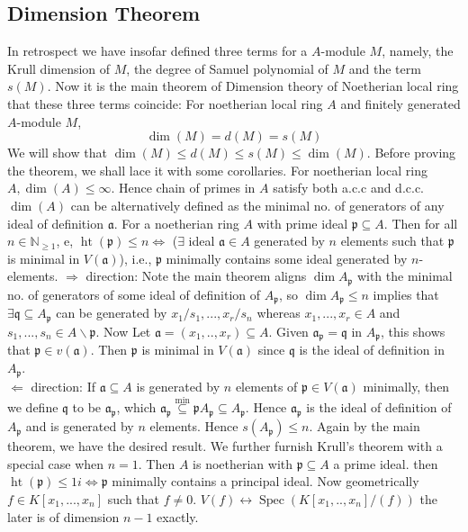 \documentclass[12pt]{article}
\theoremstyle{definition}
\theoremstyle{plain}
\DeclareMathOperator{\Spec}{Spec}
\DeclareMathOperator{\Ht}{ht}
\newcommand{\nat}{\mathbb{N}}
\begin{document}
\subsection{Dimension Theorem}
In retrospect we have insofar defined three terms for a $A$-module $M$, namely, the Krull dimension of $M$, the degree of Samuel polynomial of $M$ and the term $s(M)$.
Now it is the main theorem of Dimension theory of Noetherian local ring that these three terms coincide:
 For noetherian local ring $A$ and finitely generated $A$-module $M$,
\[\dim (M)=d(M)=s(M)\]
\Rmk We will show that $\dim(M)\leq d(M)\leq s(M)\leq \dim(M)$. Before proving the theorem, we shall lace it with some corollaries.
\Cor For noetherian local ring $A, \dim(A)\leq \infty$. Hence chain of primes in $A$ satisfy both a.c.c and d.c.c.
\Cor $\dim(A)$ can be alternatively defined as the minimal no. of generators of any ideal of definition $\mathfrak{a}$.
 For a noetherian ring $A$ with prime ideal $\mathfrak{p}\subseteq A$. Then for all $n\in \nat_{\geq 1}$, e, $\Ht(\mathfrak{p})\leq n \iff$ ($\exists$ ideal $\mathfrak{a}\in A$ generated by $n$ elements such that $\mathfrak{p}$ is minimal in $V(\mathfrak{a})$), i.e., $\mathfrak{p}$ minimally contains some ideal generated by $n$-elements.
$\Rightarrow$ direction: Note the main theorem aligns $\dim A_\mathfrak{p}$ with the minimal no. of generators of some ideal of definition of $A_\mathfrak{p}$, so $\dim A_\mathfrak{p}\leq n$ implies that $\exists \mathfrak{q}\subseteq A_\mathfrak{p}$ can be generated by $x_1/s_1, ..., x_r/s_n$ whereas $x_1, ..., x_r\in A$ and $s_1, ..., s_n\in A\backslash \mathfrak{p}$. Now Let $\mathfrak{a}=(x_1, .., x_r)\subseteq A$. Given $\mathfrak{a}_\mathfrak{p}=\mathfrak{q}$ in $A_\mathfrak{p}$, this shows that $\mathfrak{p}\in v(\mathfrak{a})$. Then $\mathfrak{p}$ is minimal in $V(\mathfrak{a})$ since $\mathfrak{q}$ is the ideal of definition in $A_\mathfrak{p}$.\\
\indent $\Leftarrow$ direction: If $\mathfrak{a}\subseteq A$ is generated by $n$ elements of $\mathfrak{p}\in  V(\mathfrak{a})$ minimally, then we define $\mathfrak{q}$ to be $\mathfrak{a}_\mathfrak{p}$, which $\mathfrak{a}_\mathfrak{p}\overset{\text{min}}{\subseteq} \mathfrak{p}A_\mathfrak{p}\subseteq A_\mathfrak{p}$. Hence $\mathfrak{a}_\mathfrak{p}$ is the ideal of definition of $A_\mathfrak{p}$ and is generated by $n$ elements. Hence $s(A_\mathfrak{p})\leq n$. Again by the main theorem, we have the desired result. \qedhere
\Rmk We further furnish Krull's theorem with a special case when $n=1$. Then $A$ is noetherian with $\mathfrak{p}\subseteq A$ a prime ideal. then $\Ht(\mathfrak{p})\leq 1 i\iff \mathfrak{p}$ minimally contains a principal ideal.
Now geometrically $f\in K[x_1, ..., x_n]$ such that $f\neq 0$. $V(f)\leftrightarrow \Spec(K[x_1, .., x_n]/(f))$ the later is of dimension $n-1$ exactly.
\end{document}
